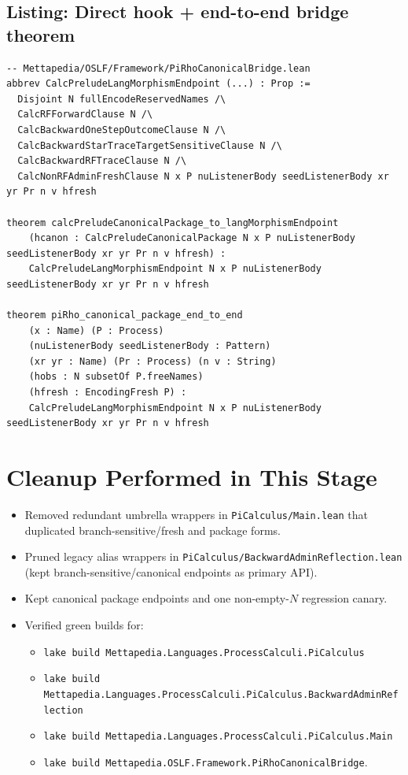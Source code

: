 \documentclass[11pt]{article}
\begin{document}
\subsection*{Listing: Direct hook + end-to-end bridge theorem}
\begin{lstlisting}
-- Mettapedia/OSLF/Framework/PiRhoCanonicalBridge.lean
abbrev CalcPreludeLangMorphismEndpoint (...) : Prop :=
  Disjoint N fullEncodeReservedNames /\
  CalcRFForwardClause N /\
  CalcBackwardOneStepOutcomeClause N /\
  CalcBackwardStarTraceTargetSensitiveClause N /\
  CalcBackwardRFTraceClause N /\
  CalcNonRFAdminFreshClause N x P nuListenerBody seedListenerBody xr yr Pr n v hfresh

theorem calcPreludeCanonicalPackage_to_langMorphismEndpoint
    (hcanon : CalcPreludeCanonicalPackage N x P nuListenerBody seedListenerBody xr yr Pr n v hfresh) :
    CalcPreludeLangMorphismEndpoint N x P nuListenerBody seedListenerBody xr yr Pr n v hfresh

theorem piRho_canonical_package_end_to_end
    (x : Name) (P : Process)
    (nuListenerBody seedListenerBody : Pattern)
    (xr yr : Name) (Pr : Process) (n v : String)
    (hobs : N subsetOf P.freeNames)
    (hfresh : EncodingFresh P) :
    CalcPreludeLangMorphismEndpoint N x P nuListenerBody seedListenerBody xr yr Pr n v hfresh
\end{lstlisting}

\section{Cleanup Performed in This Stage}
\begin{itemize}
  \item Removed redundant umbrella wrappers in \texttt{PiCalculus/Main.lean} that duplicated branch-sensitive/fresh and package forms.
  \item Pruned legacy alias wrappers in \texttt{PiCalculus/BackwardAdminReflection.lean} (kept branch-sensitive/canonical endpoints as primary API).
  \item Kept canonical package endpoints and one non-empty-$N$ regression canary.
  \item Verified green builds for:
  \begin{itemize}
    \item \texttt{lake build Mettapedia.Languages.ProcessCalculi.PiCalculus}
    \item \texttt{lake build Mettapedia.Languages.ProcessCalculi.PiCalculus.BackwardAdminReflection}
    \item \texttt{lake build Mettapedia.Languages.ProcessCalculi.PiCalculus.Main}
    \item \texttt{lake build Mettapedia.OSLF.Framework.PiRhoCanonicalBridge}.
  \end{itemize}
\end{itemize}
\end{document}
